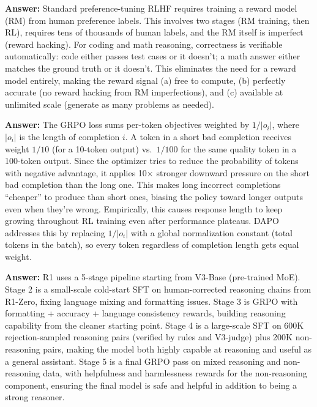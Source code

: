 \documentclass[11pt, a4paper]{article}
\begin{document}
\begin{notebox}
\textbf{Answer:} Standard preference-tuning RLHF requires training a reward model (RM) from human preference labels. This involves two stages (RM training, then RL), requires tens of thousands of human labels, and the RM itself is imperfect (reward hacking). For coding and math reasoning, correctness is verifiable automatically: code either passes test cases or it doesn't; a math answer either matches the ground truth or it doesn't. This eliminates the need for a reward model entirely, making the reward signal (a) free to compute, (b) perfectly accurate (no reward hacking from RM imperfections), and (c) available at unlimited scale (generate as many problems as needed).
\end{notebox}

\begin{notebox}
\textbf{Answer:} The GRPO loss sums per-token objectives weighted by $1/|o_i|$, where $|o_i|$ is the length of completion $i$. A token in a short bad completion receives weight $1/10$ (for a 10-token output) vs.\ $1/100$ for the same quality token in a 100-token output. Since the optimizer tries to reduce the probability of tokens with negative advantage, it applies 10$\times$ stronger downward pressure on the short bad completion than the long one. This makes long incorrect completions ``cheaper'' to produce than short ones, biasing the policy toward longer outputs even when they're wrong. Empirically, this causes response length to keep growing throughout RL training even after performance plateaus. DAPO addresses this by replacing $1/|o_i|$ with a global normalization constant (total tokens in the batch), so every token regardless of completion length gets equal weight.
\end{notebox}

\begin{notebox}
\textbf{Answer:} R1 uses a 5-stage pipeline starting from V3-Base (pre-trained MoE). Stage 2 is a small-scale cold-start SFT on human-corrected reasoning chains from R1-Zero, fixing language mixing and formatting issues. Stage 3 is GRPO with formatting + accuracy + language consistency rewards, building reasoning capability from the cleaner starting point. Stage 4 is a large-scale SFT on 600K rejection-sampled reasoning pairs (verified by rules and V3-judge) plus 200K non-reasoning pairs, making the model both highly capable at reasoning and useful as a general assistant. Stage 5 is a final GRPO pass on mixed reasoning and non-reasoning data, with helpfulness and harmlessness rewards for the non-reasoning component, ensuring the final model is safe and helpful in addition to being a strong reasoner.
\end{notebox}
\end{document}
